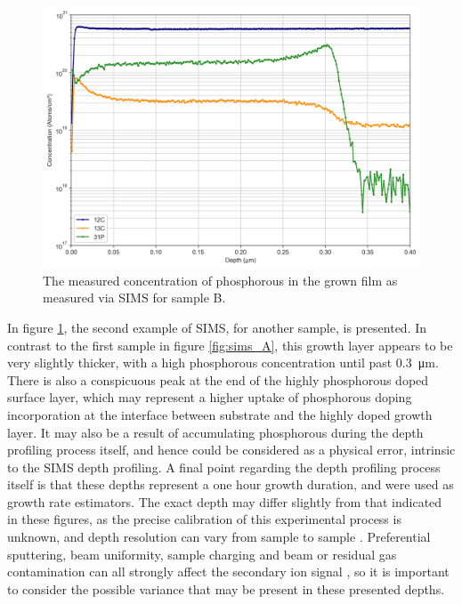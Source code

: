 \begin{refsection}
\begin{figure}[H]
\centering
\includegraphics[width=\textwidth]{SIMS Depth Profile 63A.png}
\caption{The measured concentration of phosphorous in the grown film as measured via SIMS for sample B.}
\label{fig:sims_B}
\end{figure}

In figure \ref{fig:sims_B}, the second example of SIMS, for another sample, is presented. In contrast to the first sample in figure \ref{fig:sims_A}, this growth layer appears to be very slightly thicker, with a high phosphorous concentration until past 0.3~\si{\micro\metre}. There is also a conspicuous peak at the end of the highly phosphorous doped surface layer, which may represent a higher uptake of phosphorous doping incorporation at the interface between substrate and the highly doped growth layer. It may also be a result of accumulating phosphorous during the depth profiling process itself, and hence could be considered as a physical error, intrinsic to the SIMS depth profiling. A final point regarding the depth profiling process itself is that these depths represent a one hour growth duration, and were used as growth rate estimators. The exact depth may differ slightly from that indicated in these figures, as the precise calibration of this experimental process is unknown, and depth resolution can vary from sample to sample \cite{Fiori2014}. Preferential sputtering, beam uniformity, sample charging and beam or residual gas contamination can all strongly affect the secondary ion signal \cite{Zinner1980}, so it is important to consider the possible variance that may be present in these presented depths.


\end{refsection}
